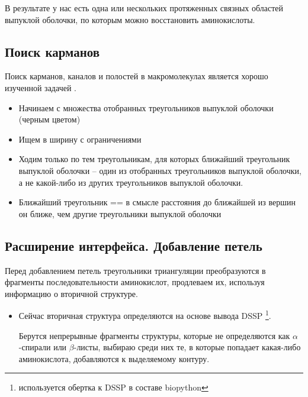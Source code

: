 В результате у нас есть одна или нескольких протяженных связных областей выпуклой оболочки, по которым можно восстановить аминокислоты.
\subsection{Поиск карманов}
Поиск карманов, каналов и полостей в макромолекулах является хорошо изученной задачей \cite{alpha_shapes1995, alpha_shapes1998, caver, ppi_kim2006}.  

\begin{itemize}
\item Начинаем с множества отобранных треугольников выпуклой оболочки (черным цветом)
\item Ищем в ширину с ограничениями
\item Ходим только по тем треугольникам, для которых ближайший треугольник выпуклой оболочки -- один из отобранных треугольников выпуклой оболочки, а не какой-либо из других треугольников выпуклой оболочки.
\item Ближайший треугольник == в смысле расстояния до ближайшей из вершин он ближе, чем другие треугольники выпуклой оболочки
\end{itemize}
\cite{alpha_shapes1995, alpha_shapes1998}
\subsection{Расширение интерфейса. Добавление петель}

Перед добавлением петель треугольники триангуляции преобразуются в фрагменты последовательности аминокислот, продлеваем их, используя информацию о вторичной структуре.


\begin{itemize}
\item Сейчас вторичная структура определяются на основе вывода DSSP \footnote{используется обертка к DSSP в составе biopython}.

Берутся непрерывные фрагменты структуры, которые не определяются как $\alpha$-спирали или $\beta$-листы, выбираю среди них те, в которые попадает какая-либо аминокислота, добавляются к выделяемому контуру.


\end{itemize}


